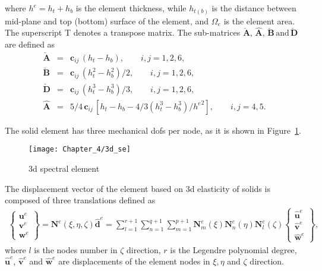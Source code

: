 \documentclass[11pt,a4paper,final]{report}
\theoremstyle{plain}
\begin{document}
where \(h^e=h_t+h_b\) is the element thickness, while \(h_{t(b)}\) is the distance between mid-plane and top (bottom) surface of the element, and \(\Omega_e\) is the element area.
The superscript T denotes a transpose matrix.
The sub-matrices \(\check{\textbf{A}},\,\hat{\textbf{A}},\,\check{\textbf{B}}\,\mathrm{and}\,\check{\textbf{D}}\) are defined as
\begin{eqnarray}
	\check{\textbf{A}} & = & \textbf{c}_{ij}\,(h_t-h_b),\qquad i,j=1,2,6\nonumber,\\
	\check{\textbf{B}} & = & \textbf{c}_{ij}\,(h_t^2-h_b^2)/2,\qquad i,j=1,2,6\nonumber,\\
	\check{\textbf{D}} & = & \textbf{c}_{ij}\,(h_t^3-h_b^3)/3,\qquad i,j=1,2,6\nonumber,\\
	\hat{\textbf{A}} & = & 5/4\,\textbf{c}_{ij}\,\left[h_t-h_b-4/3\left(h_t^3-h_b^3\right)/{h^e}^2\right],\qquad i,j=4,5.
\end{eqnarray}
\label{sec:3Dmodel}

The solid element has three mechanical \acp{dof} per node, as it is shown in Figure~\ref{fig:3d_se}.
\begin{figure}
	\begin{center}
		\texttt{[image: Chapter\_4/3d\_se]}
	\end{center}
	\caption{\Acl{3d} spectral element}
	\label{fig:3d_se}
\end{figure}
The displacement vector of the element based on \ac{3d} elasticity of solids is composed of three translations defined as
\begin{eqnarray}
	\left \{ \begin{array}{c}
		\textbf{u}^e\\
		\textbf{v}^e\\
		\textbf{w}^e
	\end{array} \right\} = \textbf{N}^e(\xi,\eta, \zeta)\widehat{\textbf{d}}^e = \sum_{l=1}^{r+1}\sum_{n=1}^{q+1}\sum_{m=1}^{p+1}\textbf{N}_m^e(\xi)\textbf{N}_n^e(\eta)\textbf{N}_l^e(\zeta)
	\left \{ \begin{array}{c}
		\widehat{\textbf{u}}^e\\
		\widehat{\textbf{v}}^e\\
		\widehat{\textbf{w}}^e
	\end{array} \right\},
	\label{eq:3D_displ}
\end{eqnarray}
where \(l\) is the nodes number in \(\zeta\) direction, \(r\) is the Legendre polynomial degree, \(\widehat{\textbf{u}}^e\), \(\widehat{\textbf{v}}^e\) and 
\(\widehat{\textbf{w}}^e\) are displacements of the element nodes in \(\xi,\eta\) and \(\zeta\) direction.
\end{document}
